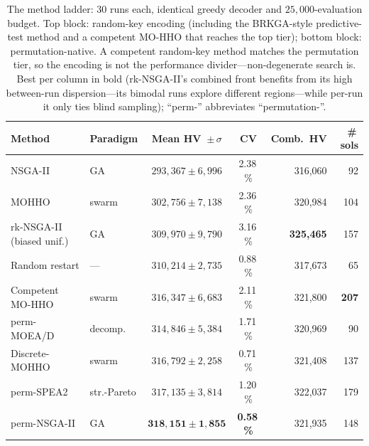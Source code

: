 \documentclass[runningheads]{llncs}
\newcommand{\HV}{\textsf{HV}}
\begin{document}
\begin{table}[t]
\centering
\caption{The method ladder: 30 runs each, identical greedy decoder and $25{,}000$-evaluation budget. Top block: random-key encoding (including the BRKGA-style predictive-test method and a competent MO-HHO that reaches the top tier); bottom block: permutation-native. A competent random-key method matches the permutation tier, so the encoding is not the performance divider---non-degenerate search is. Best per column in bold (rk-NSGA-II's combined front benefits from its high between-run dispersion---its bimodal runs explore different regions---while per-run it only ties blind sampling); ``perm-'' abbreviates ``permutation-''.}
\label{tab:ladder}
\small
\begin{tabular}{llccrr}
\toprule
\textbf{Method} & \textbf{Paradigm} & \textbf{Mean \HV\ $\pm\,\sigma$} & \textbf{CV} & \textbf{Comb.\ \HV} & \textbf{\#\,sols}\\
\midrule
NSGA-II            & GA       & $293{,}367 \pm 6{,}996$ & 2.38\,\% & 316{,}060 & 92\\
MOHHO              & swarm    & $302{,}756 \pm 7{,}138$ & 2.36\,\% & 320{,}984 & 104\\
rk-NSGA-II (biased unif.) & GA & $309{,}970 \pm 9{,}790$ & 3.16\,\% & \textbf{325{,}465} & 157\\
Random restart     & ---      & $310{,}214 \pm 2{,}735$ & 0.88\,\% & 317{,}673 & 65\\
Competent MO-HHO   & swarm    & $316{,}347 \pm 6{,}683$ & 2.11\,\% & 321{,}800 & \textbf{207}\\
\midrule
perm-MOEA/D                 & decomp.\ & $314{,}846 \pm 5{,}384$  & 1.71\,\% & 320{,}969 & 90\\
Discrete-MOHHO              & swarm    & $316{,}792 \pm 2{,}258$  & 0.71\,\% & 321{,}408 & 137\\
perm-SPEA2                  & str.-Pareto & $317{,}135 \pm 3{,}814$ & 1.20\,\% & 322{,}037 & 179\\
perm-NSGA-II                & GA       & $\mathbf{318{,}151 \pm 1{,}855}$ & \textbf{0.58\,\%} & 321{,}935 & 148\\
\bottomrule
\end{tabular}
\end{table}
\end{document}
